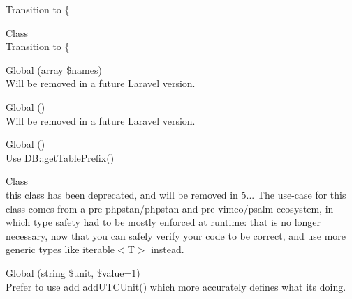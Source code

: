 \begin{DoxyRefList}
\label{deprecated__deprecated000343}%
%
Transition to \{ 
\item[Class \doxylink{class_ramsey_1_1_uuid_1_1_converter_1_1_time_1_1_big_number_time_converter}{Big\+Number\+Time\+Converter} ]\hfill \\
\label{deprecated__deprecated000345}%
%
Transition to \{ 
\item[Global \doxylink{class_illuminate_1_1_database_1_1_schema_1_1_blueprint_af93d02de3cd6685dfb494c4fc4e10aa5}{Blueprint\+::commands\+Named} (array \$names)]\hfill \\
\label{deprecated__deprecated000112}%
%
Will be removed in a future Laravel version. 
\item[Global \doxylink{class_illuminate_1_1_database_1_1_schema_1_1_blueprint_a2a1816b423720a0937cdf39f4c831675}{Blueprint\+::get\+Changed\+Columns} ()]\hfill \\
\label{deprecated__deprecated000114}%
%
Will be removed in a future Laravel version. 
\item[Global \doxylink{class_illuminate_1_1_database_1_1_schema_1_1_blueprint_a7a333affb97cf092d50f3e59edaa9066}{Blueprint\+::get\+Prefix} ()]\hfill \\
\label{deprecated__deprecated000113}%
%
Use DB\+::get\+Table\+Prefix() 
\item[Class \doxylink{class_ramsey_1_1_uuid_1_1_builder_1_1_builder_collection}{Builder\+Collection} ]\hfill \\
\label{deprecated__deprecated000340}%
%
this class has been deprecated, and will be removed in 5... The use-\/case for this class comes from a pre-\/{\ttfamily phpstan/phpstan} and pre-\/{\ttfamily vimeo/psalm} ecosystem, in which type safety had to be mostly enforced at runtime\+: that is no longer necessary, now that you can safely verify your code to be correct, and use more generic types like {\ttfamily iterable\texorpdfstring{$<$}{<}T\texorpdfstring{$>$}{>}} instead. 
\item[Global \doxylink{interface_carbon_1_1_carbon_interface_a0cc7a21fb9dda2a27f2d8b55a1c231b1}{Carbon\+Interface\+::add\+Real\+Unit} (string \$unit, \$value=1)]\hfill \\
\label{deprecated__deprecated000193}%
%
Prefer to use add add\+UTCUnit() which more accurately defines what it\textquotesingle{}s doing. 

\end{DoxyRefList}

